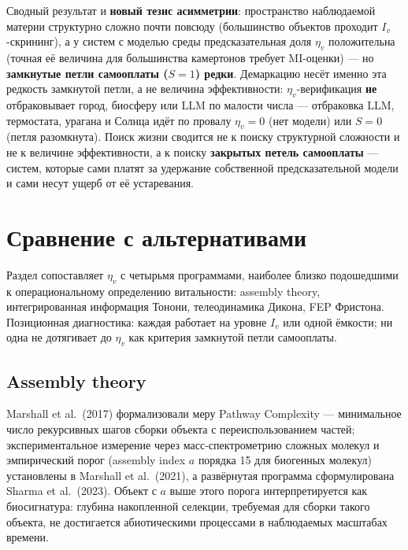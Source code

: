 \documentclass[pdflatex,sn-mathphys-ay]{sn-jnl}
\begin{document}
Сводный результат и \textbf{новый тезис асимметрии}: пространство наблюдаемой материи структурно сложно почти повсюду (большинство объектов проходит \(I_v\)-скрининг), а у систем с моделью среды предсказательная доля \(\eta_v\) положительна (точная её величина для большинства камертонов требует MI-оценки) --- но \textbf{замкнутые петли самооплаты (\(S = 1\)) редки}. Демаркацию несёт именно эта редкость замкнутой петли, а не величина эффективности: \(\eta_v\)-верификация \textbf{не} отбраковывает город, биосферу или LLM по малости числа --- отбраковка LLM, термостата, урагана и Солнца идёт по провалу \textbf{\(\eta_v = 0\)} (нет модели) или \textbf{\(S = 0\)} (петля разомкнута). Поиск жизни сводится не к поиску структурной сложности и не к величине эффективности, а к поиску \textbf{закрытых петель самооплаты} --- систем, которые сами платят за удержание собственной предсказательной модели и сами несут ущерб от её устаревания.

\section{Сравнение с альтернативами}\label{ux441ux440ux430ux432ux43dux435ux43dux438ux435-ux441-ux430ux43bux44cux442ux435ux440ux43dux430ux442ux438ux432ux430ux43cux438}

Раздел сопоставляет \(\eta_v\) с четырьмя программами, наиболее близко подошедшими к операциональному определению витальности: assembly theory, интегрированная информация Тонони, телеодинамика Дикона, FEP Фристона. Позиционная диагностика: каждая работает на уровне \(I_v\) или одной ёмкости; ни одна не дотягивает до \(\eta_v\) как критерия замкнутой петли самооплаты.

\subsection{Assembly theory}\label{assembly-theory}

Marshall et al.~(2017) формализовали меру Pathway Complexity --- минимальное число рекурсивных шагов сборки объекта с переиспользованием частей; экспериментальное измерение через масс-спектрометрию сложных молекул и эмпирический порог (assembly index \(a\) порядка 15 для биогенных молекул) установлены в Marshall et al.~(2021), а развёрнутая программа сформулирована Sharma et al.~(2023). Объект с \(a\) выше этого порога интерпретируется как биосигнатура: глубина накопленной селекции, требуемая для сборки такого объекта, не достигается абиотическими процессами в наблюдаемых масштабах времени.
\end{document}
